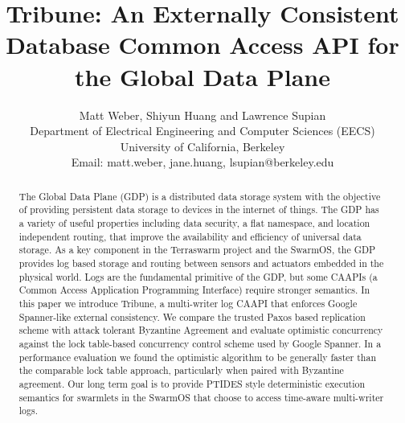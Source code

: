 \documentclass[10pt,twocolumn]{article}
\begin{document}
\title{Tribune: An Externally Consistent Database Common Access API for the Global Data Plane}
\author{Matt Weber, Shiyun Huang and Lawrence Supian\\
Department of Electrical Engineering and Computer Sciences (EECS) \\
University of California, Berkeley\\
Email: matt.weber, jane.huang, lsupian@berkeley.edu
}

\maketitle
\thispagestyle{empty}


\begin{abstract}
	The Global Data Plane (GDP) is a distributed data storage system with the objective of providing persistent data storage to devices in the internet of things. The GDP has a variety of useful properties including data security, a flat namespace, and location independent routing, that improve the availability and efficiency of universal data storage. As a key component in the Terraswarm project and the SwarmOS, the GDP provides log based storage and routing between sensors and actuators embedded in the physical world. Logs are the fundamental primitive of the GDP, but some CAAPIs (a Common Access Application Programming Interface) require stronger semantics. In this paper we introduce Tribune, a multi-writer log CAAPI that enforces Google Spanner-like external consistency. We compare the trusted Paxos based replication scheme with attack tolerant Byzantine Agreement and evaluate optimistic concurrency against the lock table-based concurrency control scheme used by Google Spanner. In a performance evaluation we found the optimistic algorithm to be generally faster than the comparable lock table approach, particularly when paired with Byzantine agreement. Our long term goal is to provide PTIDES style deterministic execution semantics for swarmlets in the SwarmOS that choose to access time-aware multi-writer logs.
\end{abstract}
\end{document}
